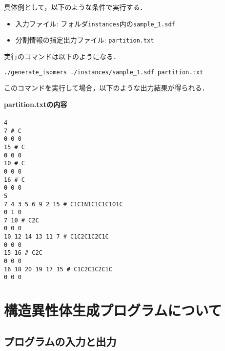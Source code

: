 \documentclass[11pt,titlepage,dvipdfmx,twoside]{jarticle}
\begin{document}
具体例として，以下のような条件で実行する．

\begin{itemize}
\item 入力ファイル: フォルダ{\tt instances}内の{\tt sample\_1.sdf}
\item 分割情報の指定出力ファイル: {\tt partition.txt}
\end{itemize}

実行のコマンドは以下のようになる．

\bigskip

{\tt ./generate\_isomers ./instances/sample\_1.sdf partition.txt}

\bigskip

このコマンドを実行して場合，以下のような出力結果が得られる．

\begin{oframed}
{\bf partition.txtの内容}\\\\
{\tt 4 \\
7 \# C \\
0 0 0 \\
15 \# C \\
0 0 0 \\
10 \# C \\
0 0 0 \\
16 \# C \\
0 0 0 \\
5 \\
7 4 3 5 6 9 2 15 \# C1C1N1C1C1C1O1C \\
0 1 0 \\
7 10 \# C2C \\
0 0 0 \\
10 12 14 13 11 7 \# C1C2C1C2C1C \\
0 0 0 \\
15 16 \# C2C \\
0 0 0 \\
16 18 20 19 17 15 \# C1C2C1C2C1C \\
0 0 0 \\}
\end{oframed}

\section{構造異性体生成プログラムについて}
\label{sec: main}

\subsection{プログラムの入力と出力}
\label{sec:InOut_m}
\end{document}
